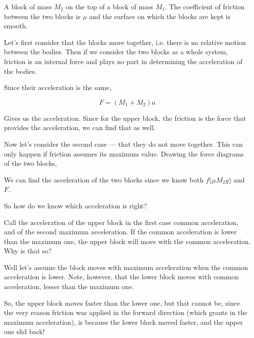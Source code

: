 \begin{marginfigure}
    \caption{A block of mass \(M_2\) on the top of a block of mass \(M_1\).
    The coefficient of friction between the two blocks is \(\mu\) and the surface on which
    the blocks are kept is smooth.}
    \label{fig: friction with blocks1}
\end{marginfigure}

Let's first consider that the blocks move together, i.e. there is no relative motion 
between the bodies. Then if we consider the two blocks as a whole system,
friction is an internal force and plays no part in determining the acceleration of the bodies.

Since their acceleration is the same, 

\begin{equation*}
    F = (M_1 + M_2)a
\end{equation*}

Gives us the acceleration. Since for the upper block, the friction is the force 
that provides the acceleration, we can find that as well.

\begin{marginfigure}
\end{marginfigure}

Now let's consider the second case --- that they do not move together. This can only happen 
if friction assumes its maximum value. Drawing the force diagrams of the two blocks,

We can find the acceleration of the two blocks since we know both \(f\)(\(\mu M_2g\)) 
and \(F\).

So how do we know which acceleration is right?

Call the acceleration of the upper block in the first case common acceleration, and of the second maximum acceleration.
If the common acceleration is lower than the maximum one, the upper block will move 
with the common acceleration. Why is that so?

\begin{marginfigure}
\end{marginfigure}

Well let's assume the block moves with maximum acceleration when the common acceleration is lower.
Note, however, that the lower block moves with common acceleration, lesser than the maximum one.

So, the upper block moves faster than the lower one, but that cannot be, since the very reason 
friction was applied in the forward direction (which grants in the maximum acceleration),
is because the lower block moved faster, and the upper one slid back!

